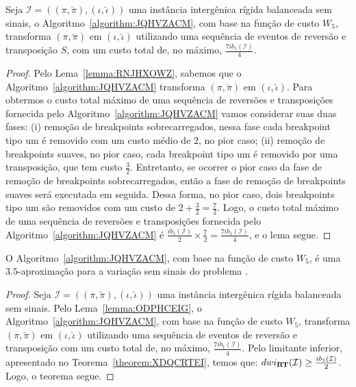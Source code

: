 \begin{lemma}\label{lemma:ODPHCEIG}
Seja $\mathcal{I} = ((\pi,\breve\pi),(\iota,\breve\iota))$ uma instância intergênica rígida balanceada sem sinais, o Algoritmo~\ref{algorithm:JQHVZACM}, com base na função de custo $W_5$, transforma $(\pi,\breve\pi)$ em $(\iota,\breve\iota)$ utilizando uma sequência de eventos de reversão e transposição $S$, com um custo total de, no máximo, $\frac{7ib_1(\mathcal{I})}{4}$.
\end{lemma}
\begin{proof}
Pelo Lema~\ref{lemma:RNJHXOWZ}, sabemos que o Algoritmo~\ref{algorithm:JQHVZACM} transforma $(\pi,\breve\pi)$ em $(\iota,\breve\iota)$. Para obtermos o custo total máximo de uma sequência de reversões e transposições fornecida pelo Algoritmo~\ref{algorithm:JQHVZACM} vamos considerar suas duas fases: (i) remoção de breakpoints sobrecarregados, nessa fase cada breakpoint tipo um é removido com um custo médio de $2$, no pior caso; (ii) remoção de breakpoints suaves, no pior caso, cada breakpoint tipo um é removido por uma transposição, que tem custo $\frac{3}{2}$. Entretanto, se ocorrer o pior caso da fase de remoção de breakpoints sobrecarregados, então a fase de remoção de breakpoints suaves será executada em seguida. Dessa forma, no pior caso, dois breakpoints tipo um são removidos com um custo de $2 + \frac{3}{2} = \frac{7}{2}$. Logo, o custo total máximo de uma sequência de reversões e transposições fornecida pelo Algoritmo~\ref{algorithm:JQHVZACM} é $\frac{ib_1(\mathcal{I})}{2} \times \frac{7}{2} = \frac{7ib_1(\mathcal{I})}{4}$, e o lema segue. 
\end{proof}

\begin{theorem}\label{theorem:SEJEYSUH}
O Algoritmo~\ref{algorithm:JQHVZACM}, com base na função de custo $W_5$, é uma $3.5$-aproxima\-ção para a variação sem sinais do problema \SbWIRT{}.
\end{theorem}
\begin{proof}
Seja $\mathcal{I} = ((\pi,\breve\pi),(\iota,\breve\iota))$ uma instância intergênica rígida balanceada sem sinais. Pelo Lema~\ref{lemma:ODPHCEIG}, o Algoritmo~\ref{algorithm:JQHVZACM}, com base na função de custo $W_5$, transforma $(\pi,\breve\pi)$ em $(\iota,\breve\iota)$ utilizando uma sequência de eventos de reversão e transposição com um custo total de, no máximo, $\frac{7ib_1(\mathcal{I})}{4}$. Pelo limitante inferior, apresentado no Teorema~\ref{theorem:XDQCRTEI}, temos que: $dwi_{\textbf{RT}}(\mathcal{I}) \ge \frac{ib_1(\mathcal{I})}{2}$. Logo, o teorema segue.
\end{proof}


